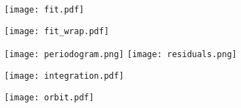\documentclass[11pt, letterpaper]{article}
\begin{document}


\begin{figure}[p]
\centering
\texttt{[image: fit.pdf]}
\end{figure}
\begin{figure}[p]
\centering
\texttt{[image: fit\_wrap.pdf]}
\end{figure}
\begin{figure}[p]
\centering
\texttt{[image: periodogram.png]}
\texttt{[image: residuals.png]}
\end{figure}
\clearpage

\clearpage
\begin{figure}[p]
\centering
\texttt{[image: integration.pdf]}
\end{figure}
\begin{figure}[p]
\centering
\centering
\texttt{[image: orbit.pdf]}
\end{figure}
\end{document}
